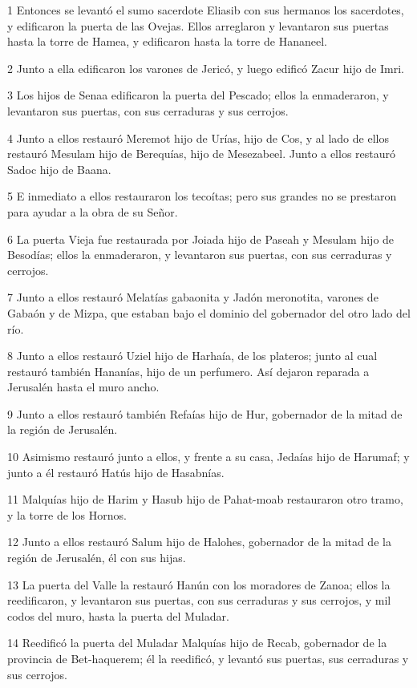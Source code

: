 \par 1 Entonces se levantó el sumo sacerdote Eliasib con sus hermanos los sacerdotes, y edificaron la puerta de las Ovejas. Ellos arreglaron y levantaron sus puertas hasta la torre de Hamea, y edificaron hasta la torre de Hananeel.
\par 2 Junto a ella edificaron los varones de Jericó, y luego edificó Zacur hijo de Imri.
\par 3 Los hijos de Senaa edificaron la puerta del Pescado; ellos la enmaderaron, y levantaron sus puertas, con sus cerraduras y sus cerrojos.
\par 4 Junto a ellos restauró Meremot hijo de Urías, hijo de Cos, y al lado de ellos restauró Mesulam hijo de Berequías, hijo de Mesezabeel. Junto a ellos restauró Sadoc hijo de Baana.
\par 5 E inmediato a ellos restauraron los tecoítas; pero sus grandes no se prestaron para ayudar a la obra de su Señor.
\par 6 La puerta Vieja fue restaurada por Joiada hijo de Paseah y Mesulam hijo de Besodías; ellos la enmaderaron, y levantaron sus puertas, con sus cerraduras y cerrojos.
\par 7 Junto a ellos restauró Melatías gabaonita y Jadón meronotita, varones de Gabaón y de Mizpa, que estaban bajo el dominio del gobernador del otro lado del río.
\par 8 Junto a ellos restauró Uziel hijo de Harhaía, de los plateros; junto al cual restauró también Hananías, hijo de un perfumero. Así dejaron reparada a Jerusalén hasta el muro ancho.
\par 9 Junto a ellos restauró también Refaías hijo de Hur, gobernador de la mitad de la región de Jerusalén.
\par 10 Asimismo restauró junto a ellos, y frente a su casa, Jedaías hijo de Harumaf; y junto a él restauró Hatús hijo de Hasabnías.
\par 11 Malquías hijo de Harim y Hasub hijo de Pahat-moab restauraron otro tramo, y la torre de los Hornos.
\par 12 Junto a ellos restauró Salum hijo de Halohes, gobernador de la mitad de la región de Jerusalén, él con sus hijas.
\par 13 La puerta del Valle la restauró Hanún con los moradores de Zanoa; ellos la reedificaron, y levantaron sus puertas, con sus cerraduras y sus cerrojos, y mil codos   del muro, hasta la puerta del Muladar.
\par 14 Reedificó la puerta del Muladar Malquías hijo de Recab, gobernador de la provincia de Bet-haquerem; él la reedificó, y levantó sus puertas, sus cerraduras y sus cerrojos.
